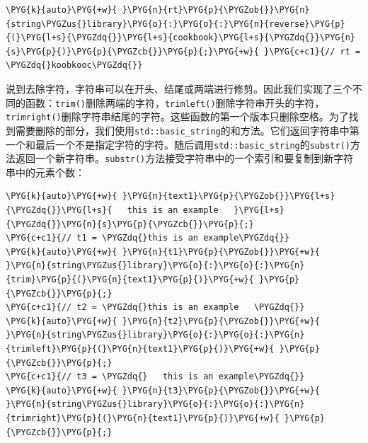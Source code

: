 
\begin{codeblockbg}
\begin{Verbatim}[commandchars=\\\{\},breaklines=true,breakanywhere=true,fontsize=\codefont,xleftmargin=17bp]
\PYG{k}{auto}\PYG{+w}{ }\PYG{n}{rt}\PYG{p}{\PYGZob{}}\PYG{n}{string\PYGZus{}library}\PYG{o}{:}\PYG{o}{:}\PYG{n}{reverse}\PYG{p}{(}\PYG{l+s}{\PYGZdq{}}\PYG{l+s}{cookbook}\PYG{l+s}{\PYGZdq{}}\PYG{n}{s}\PYG{p}{)}\PYG{p}{\PYGZcb{}}\PYG{p}{;}\PYG{+w}{ }\PYG{c+c1}{// rt = \PYGZdq{}koobkooc\PYGZdq{}}
\end{Verbatim}
\end{codeblockbg}



说到去除字符，字符串可以在开头、结尾或两端进行修剪。因此我们实现了三个不同的函数：\texttt{trim()}删除两端的字符，\texttt{trimleft()}删除字符串开头的字符，\texttt{trimright()}删除字符串结尾的字符。这些函数的第一个版本只删除空格。为了找到需要删除的部分，我们使用\texttt{std::\allowbreak{}basic\_\allowbreak{}string}的和方法。它们返回字符串中第一个和最后一个不是指定字符的字符。随后调用\texttt{std::\allowbreak{}basic\_\allowbreak{}string}的\texttt{substr()}方法返回一个新字符串。\texttt{substr()}方法接受字符串中的一个索引和要复制到新字符串中的元素个数：



\begin{codeblockbg}
\begin{Verbatim}[commandchars=\\\{\},breaklines=true,breakanywhere=true,fontsize=\codefont,xleftmargin=17bp]
\PYG{k}{auto}\PYG{+w}{ }\PYG{n}{text1}\PYG{p}{\PYGZob{}}\PYG{l+s}{\PYGZdq{}}\PYG{l+s}{   this is an example   }\PYG{l+s}{\PYGZdq{}}\PYG{n}{s}\PYG{p}{\PYGZcb{}}\PYG{p}{;}
\PYG{c+c1}{// t1 = \PYGZdq{}this is an example\PYGZdq{}}
\PYG{k}{auto}\PYG{+w}{ }\PYG{n}{t1}\PYG{p}{\PYGZob{}}\PYG{+w}{ }\PYG{n}{string\PYGZus{}library}\PYG{o}{:}\PYG{o}{:}\PYG{n}{trim}\PYG{p}{(}\PYG{n}{text1}\PYG{p}{)}\PYG{+w}{ }\PYG{p}{\PYGZcb{}}\PYG{p}{;}
\PYG{c+c1}{// t2 = \PYGZdq{}this is an example   \PYGZdq{}}
\PYG{k}{auto}\PYG{+w}{ }\PYG{n}{t2}\PYG{p}{\PYGZob{}}\PYG{+w}{ }\PYG{n}{string\PYGZus{}library}\PYG{o}{:}\PYG{o}{:}\PYG{n}{trimleft}\PYG{p}{(}\PYG{n}{text1}\PYG{p}{)}\PYG{+w}{ }\PYG{p}{\PYGZcb{}}\PYG{p}{;}
\PYG{c+c1}{// t3 = \PYGZdq{}   this is an example\PYGZdq{}}
\PYG{k}{auto}\PYG{+w}{ }\PYG{n}{t3}\PYG{p}{\PYGZob{}}\PYG{+w}{ }\PYG{n}{string\PYGZus{}library}\PYG{o}{:}\PYG{o}{:}\PYG{n}{trimright}\PYG{p}{(}\PYG{n}{text1}\PYG{p}{)}\PYG{+w}{ }\PYG{p}{\PYGZcb{}}\PYG{p}{;}
\end{Verbatim}
\end{codeblockbg}


